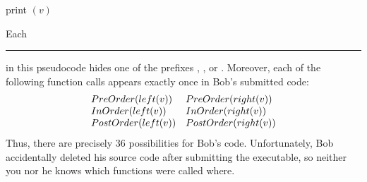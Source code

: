 \begin{exercises}
\begin{enumerate}[label=\arabic*.,ref=\thechapter.\arabic*,leftmargin=*,align=left,itemsep=1.5ex plus 0.5ex,resume]
\begin{center}
\begin{minipage}[t]{0.33\linewidth}
\begin{pseudocode}
\Indent print $(v)$
\end{pseudocode}
\end{minipage}
\end{center}
Each \rule{1.5em}{1.4ex} in this pseudocode hides one of the prefixes , , or . Moreover, each of the following function calls appears exactly once in Bob’s submitted code:
\[
\begin{array}{ll}
PreOrder(left(v)) & PreOrder(right(v))\\
InOrder(left(v)) & InOrder(right(v))\\
PostOrder(left(v)) & PostOrder(right(v))
\end{array}
\]
Thus, there are precisely 36 possibilities for Bob’s code. Unfortunately, Bob accidentally deleted his source code after submitting the executable, so neither you nor he knows which functions were called where.


\end{enumerate}
\end{exercises}
